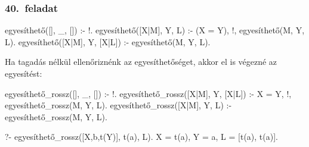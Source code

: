 \subsubsection*{40.~feladat}
\begin{program}
egyesíthető([], _, []) :- !. 
egyesíthető([X|M], Y, L) :-
    \+(X = Y), !, egyesíthető(M, Y, L). 
egyesíthető([X|M], Y, [X|L]) :-
    egyesíthető(M, Y, L). 
\end{program}
Ha tagadás nélkül ellenőriznénk az egyesíthetőséget,
akkor el is végezné az egyesítést:
\begin{program}
egyesíthető_rossz([], _, []) :- !. 
egyesíthető_rossz([X|M], Y, [X|L]) :-
    X = Y, !, egyesíthető_rossz(M, Y, L). 
egyesíthető_rossz([X|M], Y, L) :-
    egyesíthető_rossz(M, Y, L). 
\end{program}
\begin{query}
?- egyesíthető_rossz([X,b,t(Y)], t(a), L).
X = t(a),
Y = a,
L = [t(a), t(a)].
\end{query}
